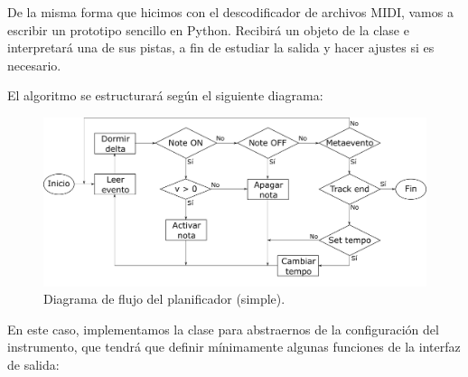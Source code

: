 De la misma forma que hicimos con el descodificador de archivos \acrshort{MIDI}, vamos a escribir un prototipo sencillo en Python. Recibirá un objeto de la clase  e interpretará una de sus pistas, a fin de estudiar la salida y hacer ajustes si es necesario.

El algoritmo se estructurará según el siguiente diagrama:

\smallskip

\begin{figure}[H]
	\noindent \begin{centering}
		\includegraphics[width=\linewidth*3/4]{capitulo5/flujo_planificacion}
		\par\end{centering}
	\smallskip
	\caption{\label{fig:flujo_planificacion} Diagrama de flujo del planificador (simple).}
\end{figure}

\smallskip

En este caso, implementamos la clase  para abstraernos de la configuración del instrumento, que tendrá que definir mínimamente algunas funciones de la interfaz de salida:

